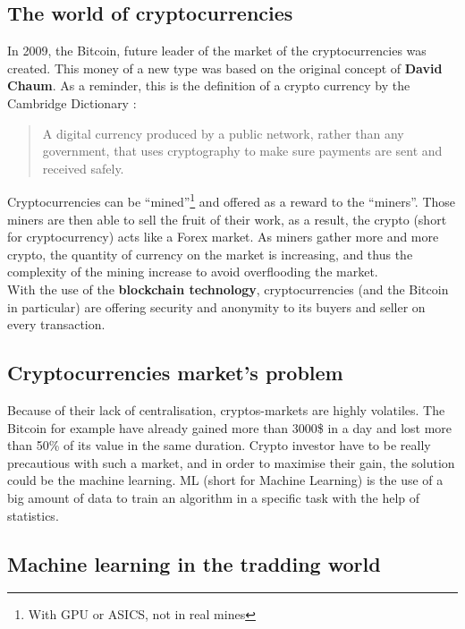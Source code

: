 \documentclass[conference]{IEEEtran}
\begin{document}
\subsection{The world of cryptocurrencies}

In 2009, the Bitcoin, future leader of the market of the cryptocurrencies was created. This money of a new type was based on the original concept of \textbf{David Chaum}. As a reminder, this is the definition of a crypto currency by the Cambridge Dictionary :\\
\begin{quote}
A digital currency produced by a public network, rather than any government, that uses cryptography to make sure payments are sent and received safely.\cite{b1}\\
\end{quote}

Cryptocurrencies can be ``mined''\footnote{With GPU or ASICS, not in real mines} and offered as a reward to the ``miners''. Those miners are then able to sell the fruit of their work, as a result, the crypto (short for cryptocurrency) acts like a Forex market. As miners gather more and more crypto, the quantity of currency on the market is increasing, and thus the complexity of the mining increase to avoid overflooding the market.\\

With the use of the \textbf{blockchain technology}, cryptocurrencies (and the Bitcoin in particular) are offering security and anonymity to its buyers and seller on every transaction.\\


\subsection{Cryptocurrencies market's problem }

Because of their lack of centralisation, cryptos-markets are highly volatiles. The Bitcoin for example have already gained more than 3000\$ in a day and lost more than 50\% of its value in the same duration\cite{b2}. Crypto investor have to be really precautious with such a market, and in order to maximise their gain, the solution could be the machine learning. ML (short for Machine Learning) is the use of a big amount of data to train an algorithm in a specific task with the help of statistics. 

\subsection{Machine learning in the tradding world}
\end{document}
